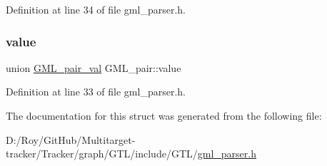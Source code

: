 Definition at line 34 of file gml\+\_\+parser.\+h.

\mbox{\label{struct_g_m_l__pair_aef8797e7d2fc0d2e2f628ce9c2783a6c}} 
\subsubsection{\texorpdfstring{value}{value}}
{\footnotesize\ttfamily union \mbox{\hyperlink{union_g_m_l__pair__val}{G\+M\+L\+\_\+pair\+\_\+val}} G\+M\+L\+\_\+pair\+::value}



Definition at line 33 of file gml\+\_\+parser.\+h.



The documentation for this struct was generated from the following file\+:\begin{DoxyCompactItemize}
\item 
D\+:/\+Roy/\+Git\+Hub/\+Multitarget-\/tracker/\+Tracker/graph/\+G\+T\+L/include/\+G\+T\+L/\mbox{\hyperlink{gml__parser_8h}{gml\+\_\+parser.\+h}}\end{DoxyCompactItemize}
